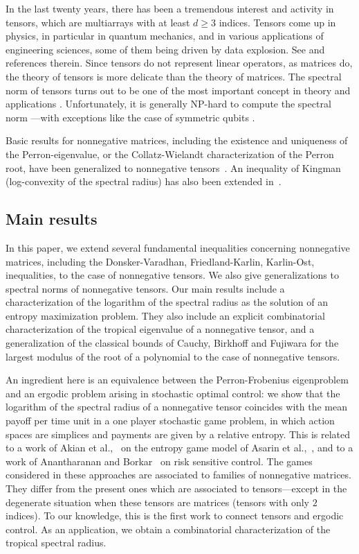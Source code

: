 \documentclass{amsart}
\newcommand{\0}{\mathbf{0}}
\newcommand{\1}{\mathbf{1}}
\theoremstyle{remark}
\numberwithin{equation}{section} %
\renewcommand{\ge}{\geqslant}
\begin{document}
 In the last twenty years, there has been a tremendous interest and activity in tensors, which are multiarrays with at least $d\ge 3$ indices.
 Tensors come up in physics, in particular in quantum mechanics, and in various applications of engineering sciences, some of them being driven by data explosion.
%
%
See {{\cite{BGL17, DFLW17, FLS14, FL17, FT15, Lim05, Lim13, Lan12,ZNL18}}} and references therein.
 Since tensors do not represent linear operators, as matrices do, the theory of tensors is more delicate than the theory of matrices.  The spectral norm of tensors turns out to be one of the most important concept in theory and applications \cite{BGL17, HL13, FL17, Lim05}.  Unfortunately, it is generally NP-hard to compute the spectral norm \cite{HL13, FL17}---with exceptions like the case of symmetric {{qubits}} \cite{FW16}. 
%
%
%

%
%
%
%
%
%
%
%
%
%
%
%
Basic results for nonnegative matrices, including the existence and uniqueness of the Perron-eigenvalue, or the Collatz-Wielandt characterization of the Perron root, have been generalized to nonnegative tensors~\cite{CPZ08,FGH,Lim05,NQZ09}. An  inequality of Kingman (log-convexity of the spectral radius) has also been extended in~\cite{ZQL10}.
%
\subsection{Main results}
 In this paper, we extend several fundamental inequalities concerning nonnegative matrices, including the Donsker-Varadhan, Friedland-Karlin, Karlin-Ost, 
 inequalities,  to the case of nonnegative tensors. 
We also give generalizations to spectral norms of nonnegative tensors.
Our main results include a characterization of the logarithm of the spectral radius as the solution of an entropy maximization problem. They also include
an explicit combinatorial characterization of the tropical eigenvalue
of a nonnegative tensor, and a generalization of the classical bounds
of Cauchy, Birkhoff and Fujiwara for the largest
modulus of the root of a polynomial to the case of nonnegative tensors.
%
%

%
%
%
%
%
%
%
%
%
%
%

%
%
%
%
%
%
%
%
An ingredient here is an equivalence
between the Perron-Frobenius eigenproblem and an ergodic problem
arising in stochastic optimal control: we show that the
logarithm of the spectral radius of a nonnegative tensor coincides with the mean
payoff per time unit in a one player stochastic game problem, in which action spaces are simplices and payments are
given by a relative entropy. This is related 
to a work of Akian et al.,~\cite{akian_et_al:LIPIcs:2017:7026,AB17}
on the entropy game model of Asarin et al.,~\cite{asarin},
and to a work of Anantharanan and Borkar~\cite{AB17} on risk
sensitive control. The games considered in these approaches are associated
to families of nonnegative matrices. They 
differ from the present ones which are associated to tensors---except in the degenerate situation when these tensors are matrices (tensors with only $2$ indices). 
%
%
%
%
%
%
To our knowledge, this is the first work to connect
%
tensors and ergodic control.
%
As an application, we obtain a combinatorial
characterization of the tropical spectral radius.
%
%
\end{document}
